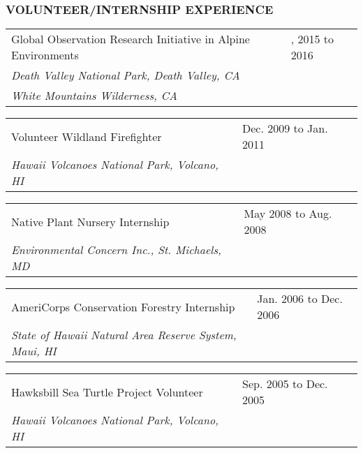 \documentclass[11pt,english]{article}
\providecommand{\tabularnewline}{\\}
\begin{document}

\vspace{1.5ex}
\subsubsection*{VOLUNTEER/INTERNSHIP EXPERIENCE}
\vspace{-0.5ex}

\begin{tabular}{>{\raggedright}p{4.5in}>{\raggedleft}p{1.5in}}
Global Observation Research Initiative in Alpine Environments & 2013, 2015 to 2016\tabularnewline
\hspace{1.5em}\emph{Death Valley National Park, Death Valley, CA}\\
\hspace{1.5em}\emph{White Mountains Wilderness, CA}
\end{tabular}

\begin{tabular}{>{\raggedright}p{4in}>{\raggedleft}p{2in}}
Volunteer Wildland Firefighter & Dec. 2009 to Jan. 2011\tabularnewline
\hspace{1.5em}\emph{Hawaii Volcanoes National Park, Volcano, HI}\tabularnewline
\end{tabular}

\begin{tabular}{>{\raggedright}p{4in}>{\raggedleft}p{2in}}
Native Plant Nursery Internship & May 2008 to Aug. 2008 \tabularnewline
\hspace{1.5em}\emph{Environmental Concern Inc., St. Michaels, MD}\tabularnewline
\end{tabular}

\begin{tabular}{>{\raggedright}p{4in}>{\raggedleft}p{2in}}
AmeriCorps Conservation Forestry Internship & Jan. 2006 to Dec. 2006\tabularnewline
\hspace{1.5em}\emph{State of Hawaii Natural Area Reserve System, Maui, HI}\tabularnewline
\end{tabular}

\begin{tabular}{>{\raggedright}p{4in}>{\raggedleft}p{2in}}
Hawksbill Sea Turtle Project Volunteer & Sep. 2005 to Dec. 2005\tabularnewline
\hspace{1.5em}\emph{Hawaii Volcanoes National Park, Volcano, HI}\tabularnewline
\end{tabular}

\end{document}
